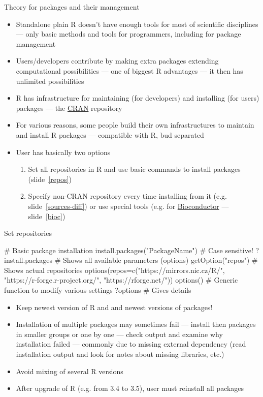 \documentclass[compress, ucs, xelatex, 11pt, xcolor=svgnames,
	hyperref={
		bookmarks=true,
		unicode=true,
		colorlinks=true,
		pdftitle={Molecular data in R},
		plainpages=false,
		pdfauthor={Vojtech Zeisek},
		pdfsubject={Course about phylogeny and evolution in R},
		pdfcreator={XeLaTeX},
		pdfkeywords={R, evolution, phylogeny, molecular data},
		linkcolor=Tomato,
		anchorcolor=SaddleBrown,
		citecolor=Goldenrod,
		filecolor=DarkMagenta,
		menucolor=Sienna,
		urlcolor=DarkTurquoise,
		pdftex},
	url={hyphens, lowtilde} %
	]{beamer}
\begin{document}
\begin{frame}{Theory for packages and their management}
	\begin{itemize}
		\item Standalone plain R doesn't have enough tools for most of scientific disciplines --- only basic methods and tools for programmers, including for package management
		\item Users/developers contribute by making extra packages extending computational possibilities --- one of biggest R advantages --- it then has unlimited possibilities
		\item R has infrastructure for maintaining (for developers) and installing (for users) packages --- the \href{https://CRAN.R-project.org/}{CRAN} repository
		\item For various reasons, some people build their own infrastructures to maintain and install R packages --- compatible with R, bud separated
		\item User has basically two options
		\begin{enumerate}
			\item Set all repositories in R and use basic commands to install packages (slide~\ref{repos})
			\item Specify non-CRAN repository every time installing from it (e.g. slide~\ref{sources-diff}) or use special tools (e.g. for \href{https://bioconductor.org/install/}{Bioconductor} --- slide~\ref{bioc})
		\end{enumerate}
	\end{itemize}
\end{frame}

\begin{frame}[fragile]{Set repositories}
	\label{repos}
	\begin{spluscode}
    # Basic package installation
    install.packages("PackageName") # Case sensitive!
    ?install.packages # Shows all available parameters (options)
    getOption("repos") # Shows actual repositories
    options(repos=c("https://mirrors.nic.cz/R/",
      "https://r-forge.r-project.org/", "https://rforge.net/"))
    options() # Generic function to modify various settings
    ?options # Gives details
	\end{spluscode}
	\begin{itemize}
		\item \alert{Keep newest version of R and and newest versions of packages!}
		\item Installation of multiple packages may sometimes fail --- install then packages in smaller groups or one by one --- check output and examine why installation failed --- commonly due to missing external dependency (read installation output and look for notes about missing libraries, etc.)
		\item Avoid mixing of several R versions
		\item After upgrade of R (e.g. from 3.4 to 3.5), user must reinstall all packages
	\end{itemize}
\end{frame}
\end{document}
